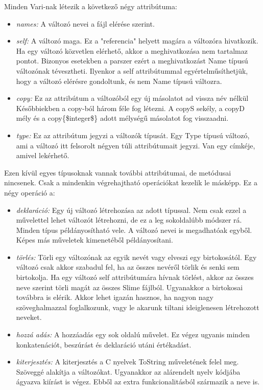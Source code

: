 Minden Vari-nak létezik a következő négy attribútuma:
\begin{itemize}
\item \emph{names:} 
A változó nevei a fájl elérése szerint.
\item \emph{self:} 
A változó maga. 
Ez a "referencia" helyett magára a változóra hivatkozik.
Ha egy változó közvetlen elérhető, akkor a meghivatkozása nem tartalmaz pontot.
Bizonyos esetekben a parszer ezért a meghivatkozást Name típusú változónak tévesztheti.
Ilyenkor a self attribútummal egyértelműsíthetjük, hogy a változó elérésre gondoltunk, és nem Name típusú változra.
\item \emph{copy:}
Ez az attribútum a változóból egy új másolatot ad vissza név nélkül
Későbbiekben a copy-ból három féle fog létezni. 
A copyS sekély, a copyD mély és a copy\{\$integer\$\} adott mélységű másolatot fog visszaadni.
\item \emph{type:}
Ez az attribútum jegyzi a változók típusát.
Egy Type típusú változó, ami a változó itt felsorolt négyen túli attribútumait jegyzi.
Van egy címkéje, amivel lekérhető.
\end{itemize}

Ezen kívül egyes típusoknak vannak további attribútumai, de metódusai nincsenek. 
Csak a mindenkin végrehajtható operációkat kezelik le másképp. 
Ez a négy operáció a:
\begin{itemize}
\item \emph{deklaráció:} 
Egy új változó létrehozása az adott típussal.
Nem csak ezzel a művelettel lehet változót létrehozni, de ez a leg sokoldalúbb módszer rá.
Minden típus példányosítható vele.
A változó nevei is megadhatóak egyből.
Képes más műveletek kimenetéből példányosítani.
\item \emph{törlés:} 
Törli egy változónak az egyik nevét vagy elveszi egy birtokosától.
Egy változó csak akkor szabadul fel, ha az összes nevéről törlik és senki sem birtokolja.
Ha egy változó self attribútumára hívnak törlést, akkor az összes neve szerint törli magát az összes Slime fájlból.
Ugyanakkor a birtokosai továbbra is elérik.
Akkor lehet igazán hasznos, ha nagyon nagy szöveghalmazzal foglalkozunk, vagy le akarunk tiltani ideiglenesen létrehozott neveket.
\item \emph{hozzá adás:}
A hozzáadás egy sok oldalú művelet. 
Ez végez ugyanis minden konkatenációt, beszúrást és deklaráció utáni értékadást.
\item \emph{kiterjesztés:}
A kiterjesztés a C nyelvek ToString műveletének felel meg. 
Szöveggé alakítja a változókat.
Ugyanakkor az alárendelt nyelv kódjába ágyazva kiírást is végez.
Ebből az extra funkcionalitásból származik a neve is.
\end{itemize}


